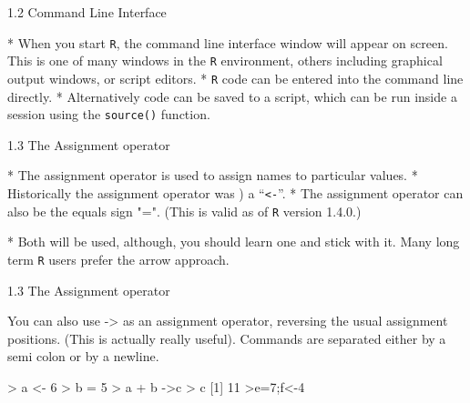 \documentclass{beamer}
\begin{document}
 
 
{1.2 Command Line Interface}
 
 *  When you start \texttt{R}, the command line interface window will appear on screen. This is one
 of many windows in the \texttt{R} environment, others including graphical output windows, or script
 editors. 
 *  \texttt{R} code can be entered into the command line directly. 
 *  Alternatively code can be saved
 to a script, which can be run inside a session using the \texttt{source()} function.

 
 
{1.3 The Assignment operator}
 
 *  The assignment operator is used to assign names to particular values. 
 *  Historically the assignment
 operator was ) a ``\texttt{<-}”. 
 *  The assignment operator can also be the equals sign "=". (This is valid as of \texttt{R}
 version 1.4.0.)
 
 *  Both will be used, although, you should learn one and stick with it. Many long term \texttt{R}
 users prefer the arrow approach. 

 
 
 
{1.3 The Assignment operator}
 
 You can also use -> as an assignment operator, reversing the
 usual assignment positions. (This is actually really useful). Commands are separated either by
 a semi colon or by a newline.
 \begin{framed}
 \begin{semiverbatim}
 > a <- 6
 > b = 5
 > a + b ->c
 > c
 [1] 11
 >e=7;f<-4
 \end{semiverbatim}
 \end{framed}
 
 
\end{document}
